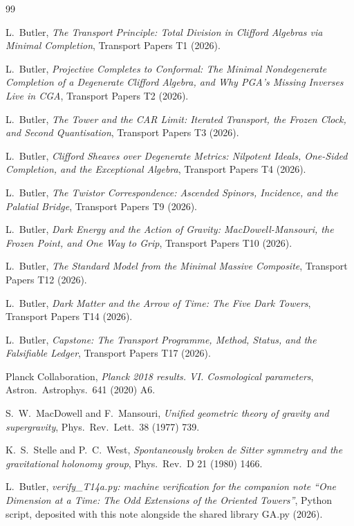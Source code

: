 \documentclass[11pt]{article}
\theoremstyle{definition}
\begin{document}
\begin{thebibliography}{99}

L.~Butler,
\emph{The Transport Principle: Total Division in Clifford Algebras via Minimal Completion},
Transport Papers T1 (2026).

L.~Butler,
\emph{Projective Completes to Conformal: The Minimal Nondegenerate Completion of a Degenerate Clifford Algebra, and Why PGA's Missing Inverses Live in CGA},
Transport Papers T2 (2026).

L.~Butler,
\emph{The Tower and the CAR Limit: Iterated Transport, the Frozen Clock, and Second Quantisation},
Transport Papers T3 (2026).

L.~Butler,
\emph{Clifford Sheaves over Degenerate Metrics: Nilpotent Ideals, One-Sided Completion, and the Exceptional Algebra},
Transport Papers T4 (2026).

L.~Butler,
\emph{The Twistor Correspondence: Ascended Spinors, Incidence, and the Palatial Bridge},
Transport Papers T9 (2026).

L.~Butler,
\emph{Dark Energy and the Action of Gravity: MacDowell-Mansouri, the Frozen Point, and One Way to Grip},
Transport Papers T10 (2026).

L.~Butler,
\emph{The Standard Model from the Minimal Massive Composite},
Transport Papers T12 (2026).

L.~Butler,
\emph{Dark Matter and the Arrow of Time: The Five Dark Towers},
Transport Papers T14 (2026).

L.~Butler,
\emph{Capstone: The Transport Programme, Method, Status, and the Falsifiable Ledger},
Transport Papers T17 (2026).

Planck Collaboration,
\emph{Planck 2018 results. VI. Cosmological parameters},
Astron.\ Astrophys.\ 641 (2020) A6.

S.~W.~MacDowell and F.~Mansouri,
\emph{Unified geometric theory of gravity and supergravity},
Phys.\ Rev.\ Lett.\ 38 (1977) 739.

K.~S.~Stelle and P.~C.~West,
\emph{Spontaneously broken de Sitter symmetry and the gravitational holonomy group},
Phys.\ Rev.\ D 21 (1980) 1466.

L.~Butler,
\emph{verify\_T14a.py: machine verification for the companion note ``One Dimension at a Time: The Odd Extensions of the Oriented Towers''},
Python script, deposited with this note alongside the shared library GA.py (2026).

\end{thebibliography}
\end{document}
